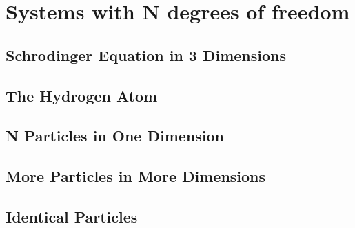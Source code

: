 \chapter{Systems with N degrees of freedom}
\section{Schrodinger Equation in 3 Dimensions}
\section{The Hydrogen Atom}
\section{N Particles in One Dimension}
\section{More Particles in More Dimensions}
\section{Identical Particles}
